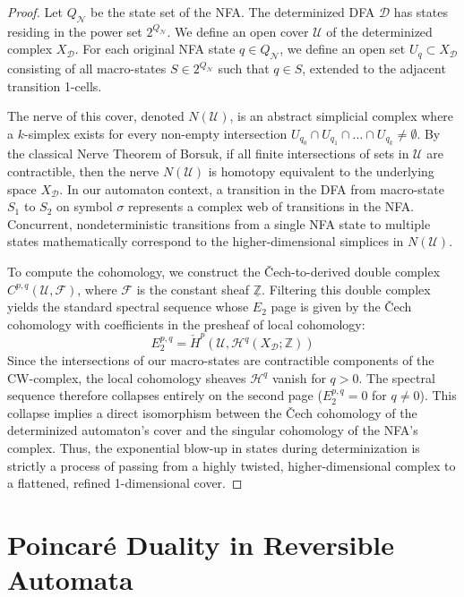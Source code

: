 \begin{proof}
Let $Q_\mathcal{N}$ be the state set of the NFA. The determinized DFA $\mathcal{D}$ has states residing in the power set $2^{Q_\mathcal{N}}$. We define an open cover $\mathcal{U}$ of the determinized complex $X_\mathcal{D}$. For each original NFA state $q \in Q_\mathcal{N}$, we define an open set $U_q \subset X_\mathcal{D}$ consisting of all macro-states $S \in 2^{Q_\mathcal{N}}$ such that $q \in S$, extended to the adjacent transition 1-cells.

The nerve of this cover, denoted $N(\mathcal{U})$, is an abstract simplicial complex where a $k$-simplex exists for every non-empty intersection $U_{q_0} \cap U_{q_1} \cap \dots \cap U_{q_k} \neq \emptyset$. 
By the classical Nerve Theorem of Borsuk, if all finite intersections of sets in $\mathcal{U}$ are contractible, then the nerve $N(\mathcal{U})$ is homotopy equivalent to the underlying space $X_\mathcal{D}$. 
In our automaton context, a transition in the DFA from macro-state $S_1$ to $S_2$ on symbol $\sigma$ represents a complex web of transitions in the NFA. Concurrent, nondeterministic transitions from a single NFA state to multiple states mathematically correspond to the higher-dimensional simplices in $N(\mathcal{U})$.

To compute the cohomology, we construct the \v{C}ech-to-derived double complex $C^{p,q}(\mathcal{U}, \mathcal{F})$, where $\mathcal{F}$ is the constant sheaf $\underline{\mathbb{Z}}$. Filtering this double complex yields the standard spectral sequence whose $E_2$ page is given by the \v{C}ech cohomology with coefficients in the presheaf of local cohomology:
\[ E_2^{p,q} = \check{H}^p(\mathcal{U}, \mathcal{H}^q(X_\mathcal{D}; \mathbb{Z})) \]
Since the intersections of our macro-states are contractible components of the CW-complex, the local cohomology sheaves $\mathcal{H}^q$ vanish for $q > 0$. The spectral sequence therefore collapses entirely on the second page ($E_2^{p,q} = 0$ for $q \neq 0$). 
This collapse implies a direct isomorphism between the \v{C}ech cohomology of the determinized automaton's cover and the singular cohomology of the NFA's complex. Thus, the exponential blow-up in states during determinization is strictly a process of passing from a highly twisted, higher-dimensional complex to a flattened, refined 1-dimensional cover.
\end{proof}

\section{Poincaré Duality in Reversible Automata}

